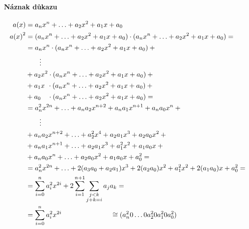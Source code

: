 \documentclass[thesis=M,czech,hidelinks]{FITthesis}[2012/06/26]
\newcommand{\0}{{\textcolor[gray]{0.75}{0}}}
\begin{document}
\paragraph{Náznak důkazu}
\begin{align*}
    a(x)     &=  a_n x^n + \ldots + a_2 x^2 + a_1 x + a_0 \\
    {a(x)}^2 &=  (a_n x^n + \ldots + a_2 x^2 + a_1 x + a_0)\cdot(a_n x^n + \ldots + a_2 x^2 + a_1 x + a_0) = \\
             &= a_n x^n   \cdot (a_n x^n + \ldots + a_2 x^2 + a_1 x + a_0) + {}                              \\
             & \qquad \vdots                                                                                 \\
             &  {} + a_2 x^2   \cdot (a_n x^n + \ldots + a_2 x^2 + a_1 x + a_0) + {}                         \\
             &  {} + a_1 x \, \:  \cdot (a_n x^n + \ldots + a_2 x^2 + a_1 x + a_0) + {}                      \\
             &  {} + a_0 \quad \cdot (a_n x^n + \ldots + a_2 x^2 + a_1 x + a_0) =                            \\
             &= a_n^2 x^{2n}    + \ldots + a_n a_2 x^{n+2} + a_n a_1 x^{n+1} + a_n a_0 x^n + {}              \\
             & \qquad \vdots                                                                                 \\
             &  {} + a_n a_2 x^{n+2} + \ldots + a_2^2 x^4       + a_2 a_1 x^3     + a_2 a_0 x^2 + {}         \\
             &  {} + a_n a_1 x^{n+1} + \ldots + a_2 a_1 x^3     + a_1^2 x^2       + a_1 a_0 x   + {}         \\
             &  {} + a_n a_0 x^n     + \ldots + a_2 a_0 x^2     + a_1 a_0 x       + a_0^2       =            \\
             &= a_n^2 x^{2n} + \ldots  + 2 ( a_3 a_0 + a_2 a_1 ) x^3  + 2 ( a_2 a_0 ) x^2 + a_1^2 x^2 + 2 ( a_1 a_0 ) x + a_0^2 = \\
             &= \sum_{i=0}^{n} a_i^2 x^{2i} + 2 \sum_{i=1}^{n+1}\sum_{\substack{j<k \\ j+k = i}} a_j a_k =   \\
             &= \sum_{i=0}^{n} a_i^2 x^{2i}
    \hspace{2.5cm} \cong (a_n^2 0 \ldots 0 a_2^2 0 a_1^2 0 a_0^2)
\end{align*}
\end{document}
